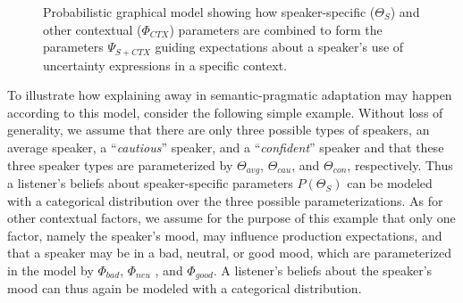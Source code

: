\documentclass[man,floatsintext]{apa6}
\begin{document}
\begin{figure}[t]
    \centering
    \caption{Probabilistic graphical model showing how speaker-specific ($\Theta_S$) and other contextual ($\Phi_{CTX}$) parameters are combined to form the parameters $\Psi_{S+CTX}$ guiding expectations about a speaker's use of uncertainty expressions in a specific context.}
    \label{fig:explaining-away-model}
\end{figure}

To illustrate how explaining away in semantic-pragmatic adaptation may happen according to this model, consider the following simple example. Without loss of generality, we assume that there are only three possible types of speakers, an average speaker, a ``\textit{cautious}'' speaker, and a ``\textit{confident}'' speaker and that these three speaker types are parameterized by $\Theta_{avg}$,  $\Theta_{cau}$, and  $\Theta_{con}$, respectively. Thus a listener's beliefs about speaker-specific parameters $P(\Theta_S)$ can be modeled with a categorical distribution over the three possible parameterizations. As for other contextual factors, we assume for the purpose of this example that only one factor, namely the speaker's mood, may influence production expectations, and that a speaker may be in a bad, neutral, or good mood, which are parameterized in the model by $\Phi_{bad}$, $\Phi_{neu}$ , and $\Phi_{good}$. A listener's beliefs about the speaker's mood can thus again be modeled with a categorical distribution.
\end{document}
